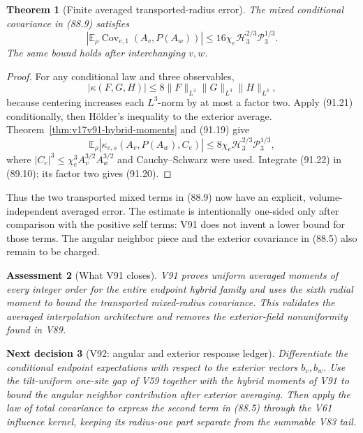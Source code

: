 \documentclass[11pt]{article}
\newtheorem{theorem}{Theorem}[section]
\newtheorem{decision}[theorem]{Next decision}
\newtheorem{assessment}[theorem]{Assessment}
\theoremstyle{remark}
\begin{document}
\begin{theorem}[Finite averaged transported-radius error]
\label{thm:v17v91-mixed-error}
The mixed conditional covariance in (88.9) satisfies
\[
\boxed{
 \left|\mathbb E_\rho
  \operatorname{Cov}_{e,1}(A_v,P(A_w))\right|
 \leq16\chi_e\mathcal H_3^{2/3}\mathcal P_3^{1/3}.} \tag{91.20}
\]
The same bound holds after interchanging \(v,w\).
\end{theorem}

\begin{proof}
For any conditional law and three observables,
\[
 |\kappa(F,G,H)|
 \leq8\|F\|_{L^3}\|G\|_{L^3}\|H\|_{L^3},          \tag{91.21}
\]
because centering increases each \(L^3\)-norm by at most a factor two.
Apply (91.21) conditionally, then H\"older's inequality to the exterior
average.  Theorem~\ref{thm:v17v91-hybrid-moments} and (91.19) give
\[
 \mathbb E_\rho|\kappa_{e,s}(A_v,P(A_w),C_e)|
 \leq8\chi_e\mathcal H_3^{2/3}\mathcal P_3^{1/3},  \tag{91.22}
\]
where
\(|C_e|^3\leq\chi_e^3A_v^{3/2}A_w^{3/2}\) and
Cauchy--Schwarz were used.  Integrate (91.22) in (89.10); its factor
two gives (91.20).
\end{proof}

Thus the two transported mixed terms in (88.9) now have an explicit,
volume-independent averaged error.  The estimate is intentionally
one-sided only after comparison with the positive self terms: V91
does not invent a lower bound for those terms.  The angular neighbor
piece and the exterior covariance in (88.5) also remain to be charged.

\begin{assessment}[What V91 closes]
\label{ass:v17v91-status}
V91 proves uniform averaged moments of every integer order for the
entire endpoint hybrid family and uses the sixth radial moment to
bound the transported mixed-radius covariance.  This validates the
averaged interpolation architecture and removes the exterior-field
nonuniformity found in V89.
\end{assessment}

\begin{decision}[V92: angular and exterior response ledger]
\label{dec:v17v91-next}
Differentiate the conditional endpoint expectations with respect to
the exterior vectors \(b_v,b_w\).  Use the tilt-uniform one-site gap
of V59 together with the hybrid moments of V91 to bound the angular
neighbor contribution after exterior averaging.  Then apply the law
of total covariance to express the second term in (88.5) through the
V61 influence kernel, keeping its radius-one part separate from the
summable V83 tail.
\end{decision}
\end{document}
